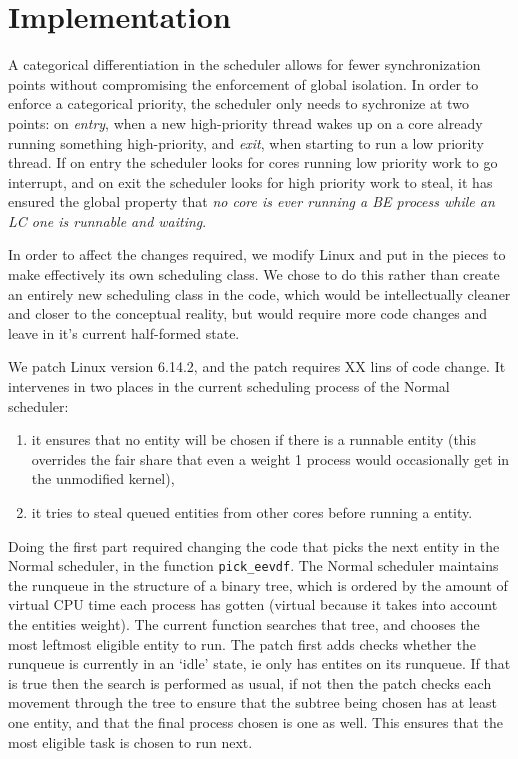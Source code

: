 \section{Implementation}\label{s:implementation}

A categorical differentiation in the scheduler allows for fewer synchronization
points without compromising the enforcement of global isolation. In order to
enforce a categorical priority, the scheduler only needs to sychronize at two
points: on \textit{entry}, when a new high-priority thread wakes up on a core
already running something high-priority, and \textit{exit}, when starting to run
a low priority thread. If on entry the scheduler looks for cores running low
priority work to go interrupt, and on exit the scheduler looks for high priority
work to steal, it has ensured the global property that \textit{no core is ever
running a BE process while an LC one is runnable and waiting}.

In order to affect the changes required, we modify Linux and put in the pieces
to make \schedidle{} effectively its own scheduling class. We chose to do this
rather than create an entirely new scheduling class in the code, which would be
intellectually cleaner and closer to the conceptual reality, but would require
more code changes and leave \schedidle{} in it's current half-formed
state.

We patch Linux version 6.14.2, and the patch requires XX lins of code change. It
intervenes in two places in the current scheduling process of the Normal
scheduler: 
\begin{enumerate}
    \item it ensures that no \schedidle{} entity will be chosen if there is a
runnable \schednormal{} entity (this overrides the fair share that even a weight
1 process would occasionally get in the unmodified kernel),
    \item it tries to steal queued \schednormal{} entities from other cores
before running a \schedidle{} entity.

\end{enumerate}


Doing the first part required changing the code that picks the next entity in
the Normal scheduler, in the function \texttt{pick\_eevdf}. The Normal scheduler
maintains the runqueue in the structure of a binary tree, which is ordered by
the amount of virtual CPU time each process has gotten (virtual because it takes
into account the entities weight). The current function searches that tree, and
chooses the most leftmost eligible entity to run. The patch first adds checks
whether the runqueue is currently in an `idle' state, ie only has \schedidle{}
entites on its runqueue. If that is true then the search is performed as usual,
if not then the patch checks each movement through the tree to ensure that the
subtree being chosen has at least one \schednormal{} entity, and that the final
process chosen is one as well. This ensures that the most eligible
\schednormal{} task is chosen to run next.

